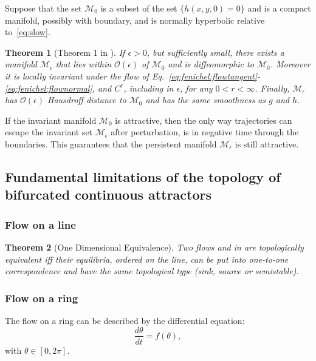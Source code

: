 \documentclass{article} %
\newcounter{ct}
\newcommand{\manifold}{\mathcal{M}}
\newtheorem{theorem}{Theorem}
\theoremstyle{definition}
\theoremstyle{remark}
\begin{document}
Suppose that the set \(\manifold_{0}\)  is a subset of the set \(\{h(x, y, 0) = 0\}\) and is a compact manifold, possibly with boundary, and is normally hyperbolic relative to~\ref{eq:slow}.


\begin{theorem}[Theorem 1 in \citep{Jones1995}]\label{theorem:originalpersistent}
If \(\epsilon >0\), but sufficiently small, there exists a manifold \(\manifold_{\epsilon}\) that lies within \(\mathcal{O}(\epsilon)\) of \(\manifold_{0}\) and is diffeomorphic to \(\manifold_{0}\).
 Moreover it is locally invariant under the flow of Eq.~\ref{eq:fenichel:flowtangent}-\ref{eq:fenichel:flownormal}, and \(C^{r}\), including in \(\epsilon\), for any \(0<r< \infty\).
 Finally, \(\manifold_{\epsilon}\) has \(\mathcal{O}(\epsilon)\) Hausdroff distance to \(\manifold_{0}\) and has the same smoothness as \(g\) and \(h\).
\end{theorem}


If the invariant manifold \(\manifold_{0}\) is attractive, then the only way trajectories can escape the invariant set \(\manifold_{\epsilon}\) after perturbation, is in negative time through the boundaries.
This guarantees that the persistent manifold \(\manifold_{\epsilon}\) is still attractive.


\subsection{Fundamental limitations of the topology of bifurcated continuous attractors}


\subsubsection{Flow on a line}
\begin{theorem}[One Dimensional Equivalence]
Two flows and in are topologically equivalent iff their equilibria, ordered on the line, can be put into one-to-one correspondence and have the same topological type (sink, source or semistable).
\end{theorem}

\subsubsection{Flow on a ring}
The flow on a ring can be described by the differential equation\citep{hirsch2013differential}:
\begin{equation}
\frac{d\theta}{dt} = f(\theta),
\end{equation}with \(\theta\in[0, 2\pi].\)
\end{document}
